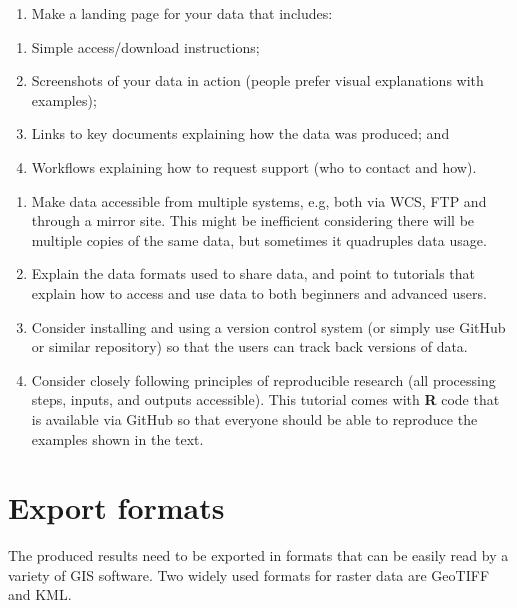 \documentclass[10pt,b5paper,]{book}
\providecommand{\tightlist}{%
  \setlength{\itemsep}{0pt}\setlength{\parskip}{0pt}}
\theoremstyle{definition}
\theoremstyle{definition}
\theoremstyle{definition}
\theoremstyle{remark}
\begin{document}
\begin{enumerate}
\def\labelenumi{\arabic{enumi}.}
\tightlist
\item
  Make a landing page for your data that includes:
\end{enumerate}

\begin{enumerate}
\def\labelenumi{\alph{enumi}.}
\tightlist
\item
  Simple access/download instructions;
\item
  Screenshots of your data in action (people prefer visual explanations
  with examples);
\item
  Links to key documents explaining how the data was produced; and
\item
  Workflows explaining how to request support (who to contact and how).
\end{enumerate}

\begin{enumerate}
\def\labelenumi{\arabic{enumi}.}
\setcounter{enumi}{1}
\tightlist
\item
  Make data accessible from multiple systems, e.g, both via WCS, FTP and
  through a mirror site. This might be inefficient considering there
  will be multiple copies of the same data, but sometimes it quadruples
  data usage.
\item
  Explain the data formats used to share data, and point to tutorials
  that explain how to access and use data to both beginners and advanced
  users.
\item
  Consider installing and using a version control system (or simply use
  GitHub or similar repository) so that the users can track back
  versions of data.
\item
  Consider closely following principles of reproducible research (all
  processing steps, inputs, and outputs accessible). This tutorial comes
  with \textbf{R} code that is available via GitHub so that everyone
  should be able to reproduce the examples shown in the text.
\end{enumerate}

\hypertarget{export-formats-1}{%
\section{Export formats}\label{export-formats-1}}

The produced results need to be exported in formats that can be easily
read by a variety of GIS software. Two widely used formats for raster
data are GeoTIFF and KML.
\end{document}
